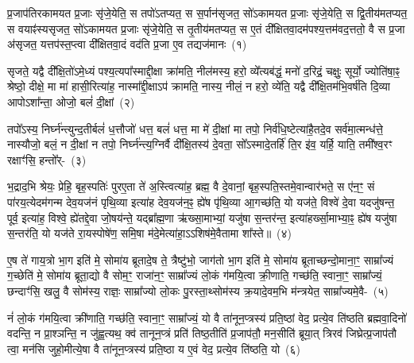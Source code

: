 \setcounter{anuvakam}{0}
प्र॒जा\-प॑तिरकामयत प्र॒जाः सृ॑जे॒येति॒ स तपो॑\-ऽतप्यत॒ स स॒र्पान॑सृजत॒ सो॑\-ऽकामयत प्र॒जाः सृ॑जे॒येति॒ स द्वि॒तीय॑म\-तप्यत॒ स वयाꣴ॑स्यसृजत॒ सो॑\-ऽकामयत प्र॒जाः सृ॑जे॒येति॒ स तृ॒तीय॑मतप्यत॒ स ए॒तं दी᳚क्षितवा॒दम॑पश्य॒त्तम॑वद॒त्ततो॒ वै स प्र॒जा अ॑सृजत॒ यत्तप॑स्त॒प्त्वा दी᳚क्षितवा॒दं वद॑ति प्र॒जा ए॒व तद्यज॑मानः~(१)\ip

सृजते॒ यद्वै दी᳚क्षि॒तो॑\-ऽमे॒ध्यं पश्य॒त्यपा᳚स्माद्दी॒क्षा क्रा॑मति॒ नील॑मस्य॒ हरो॒ व्ये᳚त्यब॑द्धं॒ मनो॑ द॒रिद्रं॒ चक्षुः॒ सूर्यो॒ ज्योति॑षा॒ꣴ॒ श्रेष्ठो॒ दीक्षे॒ मा मा॑ हासी॒रित्या॑ह॒ नास्मा᳚द्दी॒क्षा\-ऽप॑ क्रामति॒ नास्य॒ नीलं॒ न हरो॒ व्ये॑ति॒ यद्वै दी᳚क्षि॒तम॑भि॒वर्\mbox{}ष॑ति दि॒व्या आपो\-ऽशा᳚न्ता॒ ओजो॒ बलं॑ दी॒क्षां~(२)\ip

तपो᳚\-ऽस्य॒ निर्घ्न॑न्त्युन्द॒तीर्बलं॑ ध॒त्तौजो॑ धत्त॒ बलं॑ धत्त॒ मा मे॑ दी॒क्षां मा तपो॒ निर्व॑धि॒ष्टेत्या॑है॒तदे॒व सर्व॑मा॒त्मन्ध॑त्ते॒ नास्यौजो॒ बलं॒ न दी॒क्षां न तपो॒ निर्घ्न॑न्त्य॒ग्निर्वै दी᳚क्षि॒तस्य॑ दे॒वता॒ सो᳚\-ऽस्मादे॒तर्\mbox{}हि॑ ति॒र इ॑व॒ यर्\mbox{}हि॒ याति॒ तमी᳚श्व॒रꣳ रक्षाꣳ॑सि॒ हन्तो᳚र्-~(३)\ip

भ॒द्राद॒भि श्रेयः॒ प्रेहि॒ बृह॒स्पतिः॑ पुरए॒ता ते॑ अ॒स्त्वित्या॑ह॒ ब्रह्म॒ वै दे॒वानां॒ बृह॒स्पति॒स्तमे॒वान्वार॑भते॒ स ए॑न॒ꣳ॒ सं पा॑रय॒त्येदम॑गन्म देव॒यज॑नं पृथि॒व्या इत्या॑ह देव॒यज॑न॒ꣴ॒ ह्ये॑ष पृ॑थि॒व्या आ॒गच्छ॑ति॒ यो यज॑ते॒ विश्वे॑ दे॒वा यदजु॑षन्त॒ पूर्व॒ इत्या॑ह॒ विश्वे॒ ह्ये॑तद्दे॒वा जो॒षय॑न्ते॒ यद्ब्रा᳚ह्म॒णा ऋ॑ख्सा॒माभ्यां॒ यजु॑षा स॒न्तर॑न्त॒ इत्या॑हर्ख्सा॒माभ्या॒ꣴ॒ ह्ये॑ष यजु॑षा स॒न्तर॑ति॒ यो यज॑ते रा॒यस्पोषे॑ण॒ समि॒षा म॑दे॒मेत्या॑हा॒\-ऽऽ\-शिष॑मे॒वैतामा शा᳚स्ते॥~(४)\ip

{\anuvakamend[{यज॑मानो दी॒क्षाꣳ हन्तो᳚र्ब्राह्म॒णाश्चतु॑र्विꣳशतिश्च}]}

ए॒ष ते॑ गाय॒त्रो भा॒ग इति॑ मे॒ सोमा॑य ब्रूतादे॒ष ते॒ त्रैष्टु॑भो॒ जाग॑तो भा॒ग इति॑ मे॒ सोमा॑य ब्रूताच्छन्दो॒माना॒ꣳ॒ साम्रा᳚ज्यं ग॒च्छेति॑ मे॒ सोमा॑य ब्रूता॒द्यो वै सोम॒ꣳ॒ राजा॑न॒ꣳ॒ साम्रा᳚ज्यं लो॒कं ग॑मयि॒त्वा क्री॒णाति॒ गच्छ॑ति॒ स्वाना॒ꣳ॒ साम्रा᳚ज्यं॒ छन्दाꣳ॑सि॒ खलु॒ वै सोम॑स्य॒ राज्ञः॒ साम्रा᳚ज्यो लो॒कः पु॒रस्ता॒थ्सोम॑स्य क्र॒यादे॒वम॒भि म॑न्त्रयेत॒ साम्रा᳚ज्यमे॒वै-~(५)\ip

नं॑ लो॒कं ग॑मयि॒त्वा क्री॑णाति॒ गच्छ॑ति॒ स्वाना॒ꣳ॒ साम्रा᳚ज्यं॒ यो वै ता॑नून॒प्त्रस्य॑ प्रति॒ष्ठां वेद॒ प्रत्ये॒व ति॑ष्ठति ब्रह्मवा॒दिनो॑ वदन्ति॒ न प्रा॒श्ञन्ति॒ न जु॑ह्व॒त्यथ॒ क्व॑ तानून॒प्त्रं प्रति॑ तिष्ठ॒तीति॑ प्र॒जा\-प॑तौ॒ मन॒सीति॑ ब्रूया॒त् त्रिरव॑ जिघ्रेत्प्र॒जा\-प॑तौ त्वा॒ मन॑सि जुहो॒मीत्ये॒षा वै ता॑नून॒प्त्रस्य॑ प्रति॒ष्ठा य ए॒वं वेद॒ प्रत्ये॒व ति॑ष्ठति॒ यो~(६)\ip

